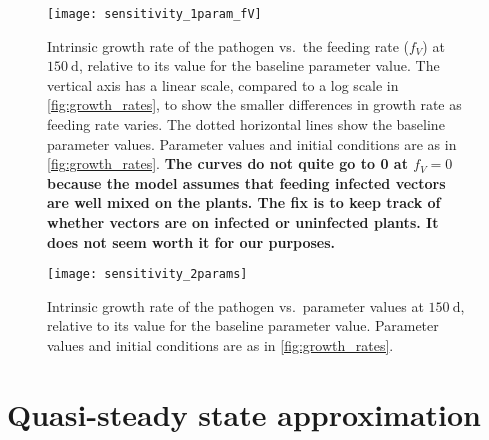 \documentclass{article}
\newcommand{\comment}[1]{\textbf{#1}}
\begin{document}
\begin{figure}
  \centering
  \texttt{[image: sensitivity\_1param\_fV]}
  \caption{Intrinsic growth rate of the pathogen vs.~the feeding rate
    ($f_V$) at $150~\text{d}$, relative to its value for the baseline
    parameter value.  The vertical axis has a linear scale, compared
    to a log scale in \autoref{fig:growth_rates}, to show the smaller
    differences in growth rate as feeding rate varies.  The dotted
    horizontal lines show the baseline parameter values.  Parameter
    values and initial conditions are as in
    \autoref{fig:growth_rates}.
    \comment{The curves do not quite go to 0 at $f_V = 0$ because
      the model assumes that feeding infected vectors are well mixed
      on the plants.  The fix is to keep track of whether vectors are
      on infected or uninfected plants.  It does not seem worth it for
      our purposes.}}
  \label{fig:sensitivity_1param_fV}
\end{figure}

\begin{figure}
  \centering
  \texttt{[image: sensitivity\_2params]}
  \caption{Intrinsic growth rate of the pathogen vs.~parameter values
    at $150~\text{d}$, relative to its value for the baseline
    parameter value.  Parameter values and
    initial conditions are as in \autoref{fig:growth_rates}.}
  \label{fig:sensitivity_2params}
\end{figure}


\clearpage
\appendix
\section{Quasi-steady state approximation}
\label{sec:QSSA}
\end{document}
